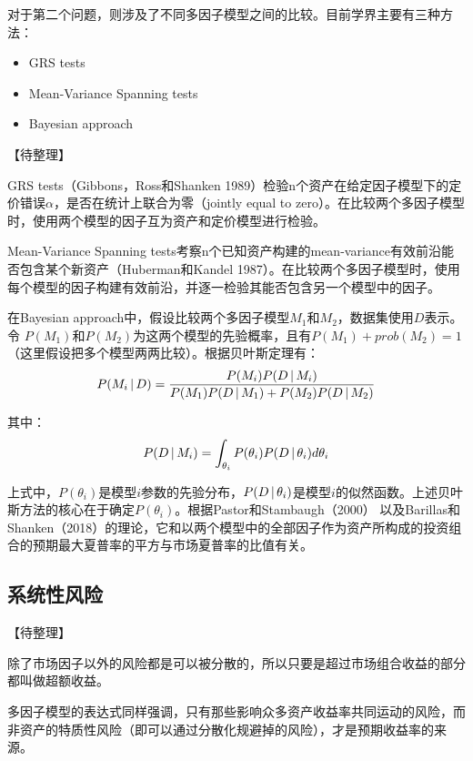 \documentclass[11pt]{article}
\begin{document}
对于第二个问题，则涉及了不同多因子模型之间的比较。目前学界主要有三种方法：
\begin{itemize}
    \item GRS tests
    \item Mean-Variance Spanning tests
    \item Bayesian approach
\end{itemize}

【待整理】

GRS tests（Gibbons，Ross和Shanken 1989）检验n个资产在给定因子模型下的定价错误$\alpha$，是否在统计上联合为零（jointly equal to zero）。在比较两个多因子模型时，使用两个模型的因子互为资产和定价模型进行检验。

Mean-Variance Spanning tests考察n个已知资产构建的mean-variance有效前沿能否包含某个新资产（Huberman和Kandel 1987）。在比较两个多因子模型时，使用每个模型的因子构建有效前沿，并逐一检验其能否包含另一个模型中的因子。

在Bayesian approach中，假设比较两个多因子模型$M_1$和$M_2$，数据集使用$D$表示。令 $P(M_1)$和$P(M_2)$为这两个模型的先验概率，且有$P(M_1) + prob(M_2) = 1$（这里假设把多个模型两两比较）。根据贝叶斯定理有：
\begin{equation*}
    P(M_i \,\vert\, D) = \frac{P(M_i)P(D \,\vert\, M_i)}{P(M_1)P(D\,\vert\, M_1) + P(M_2)P(D\,\vert\, M_2)}
\end{equation*}

其中：
\begin{equation*}
    P(D \,\vert\, M_i) = \int_{\theta_i} P(\theta_i) P(D \,\vert\, \theta_i) d\theta_i
\end{equation*}

上式中，$P(\theta_i)$是模型$i$参数的先验分布，$P(D \,\vert\, \theta_i)$是模型$i$的似然函数。上述贝叶斯方法的核心在于确定$P(\theta_i)$。根据Pastor和Stambaugh（2000） 以及Barillas和Shanken（2018）的理论，它和以两个模型中的全部因子作为资产所构成的投资组合的预期最大夏普率的平方与市场夏普率的比值有关。

\subsection{系统性风险}

【待整理】

除了市场因子以外的风险都是可以被分散的，所以只要是超过市场组合收益的部分都叫做超额收益。

多因子模型的表达式同样强调，只有那些影响众多资产收益率共同运动的风险，而非资产的特质性风险（即可以通过分散化规避掉的风险），才是预期收益率的来源。
\end{document}
